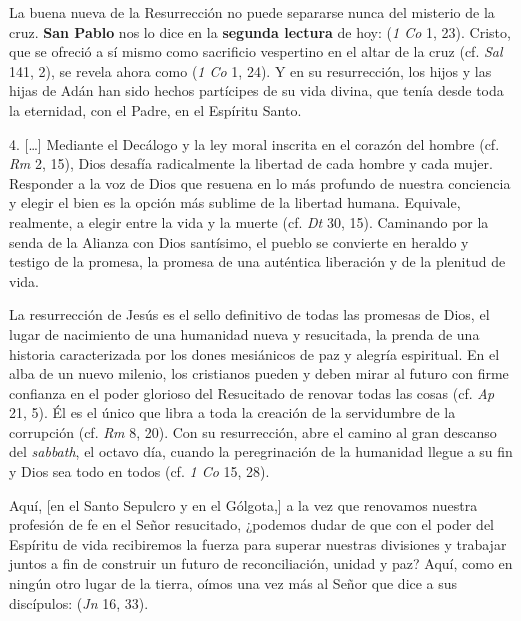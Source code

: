 \begin{body}
La buena nueva de la Resurrección no puede separarse nunca del misterio de la cruz. \textbf{San Pablo} nos lo dice en la \textbf{segunda lectura} de hoy:  (\textit{1 Co} 1, 23). Cristo, que se ofreció a sí mismo como sacrificio vespertino en el altar de la cruz (cf. \textit{Sal} 141, 2), se revela ahora como  (\textit{1 Co} 1, 24). Y en su resurrección, los hijos y las hijas de Adán han sido hechos partícipes de su vida divina, que tenía desde toda la eternidad, con el Padre, en el Espíritu Santo.

4. [\ldots] Mediante el Decálogo y la ley moral inscrita en el corazón del hombre (cf. \textit{Rm} 2, 15), Dios desafía radicalmente la libertad de cada hombre y cada mujer. Responder a la voz de Dios que resuena en lo más profundo de nuestra conciencia y elegir el bien es la opción más sublime de la libertad humana. Equivale, realmente, a elegir entre la vida y la muerte (cf. \textit{Dt} 30, 15). Caminando por la senda de la Alianza con Dios santísimo, el pueblo se convierte en heraldo y testigo de la promesa, la promesa de una auténtica liberación y de la plenitud de vida.

La resurrección de Jesús es el sello definitivo de todas las promesas de Dios, el lugar de nacimiento de una humanidad nueva y resucitada, la prenda de una historia caracterizada por los dones mesiánicos de paz y alegría espiritual. En el alba de un nuevo milenio, los cristianos pueden y deben mirar al futuro con firme confianza en el poder glorioso del Resucitado de renovar todas las cosas (cf. \textit{Ap} 21, 5). Él es el único que libra a toda la creación de la servidumbre de la corrupción (cf. \textit{Rm} 8, 20). Con su resurrección, abre el camino al gran descanso del \textit{sabbath}, el octavo día, cuando la peregrinación de la humanidad llegue a su fin y Dios sea todo en todos (cf. \textit{1 Co} 15, 28).

Aquí, [en el Santo Sepulcro y en el Gólgota,] a la vez que renovamos nuestra profesión de fe en el Señor resucitado, ¿podemos dudar de que con el poder del Espíritu de vida recibiremos la fuerza para superar nuestras divisiones y trabajar juntos a fin de construir un futuro de reconciliación, unidad y paz? Aquí, como en ningún otro lugar de la tierra, oímos una vez más al Señor que dice a sus discípulos:  (\textit{Jn} 16, 33).


\end{body}
